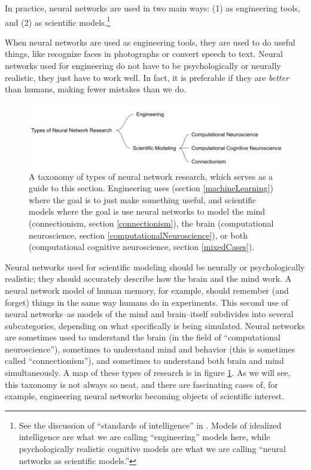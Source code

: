 In practice, neural networks are used in two main ways: (1) as engineering tools, and (2) as scientific models.\footnote{See the discussion of ``standards of intelligence'' in \cite{noelle2022artificial}. Models of idealized intelligence are what we are calling ``engineering'' models here, while psychologically realistic cognitive models are what we are calling ``neural networks as scientific models.''}

When neural networks are used as engineering tools, they are used to do useful things, like recognize faces in photographs or convert speech to text. Neural networks used for engineering do not have to be psychologically or neurally realistic, they just have to work well. In fact, it is preferable if they are \emph{better} than humans, making fewer mistakes than we do.

\begin{figure}[h]
\centering
\includegraphics[scale=0.4]{./images/TypesOfNNResearch.png}
\caption[Jeff Yoshimi.]{A taxonomy of types of neural network research, which serves as a guide to this section. Engineering uses (section \ref{machineLearning}) where the goal is to just make something useful, and scientific models where the goal is use neural networks to model the mind (connectionism, section \ref{connectionism}), the brain (computational neuroscience, section \ref{computationalNeuroscience}), or both (computational cognitive neuroscience, section \ref{mixedCases}).}
\label{typesNN}
\end{figure}

Neural networks used for scientific modeling should be neurally or psychologically realistic; they should accurately describe how the brain and the mind work. A neural network model of human memory, for example, should remember (and forget) things in the same way humans do in experiments. This second use of neural networks--as models of the mind and brain--itself subdivides into several subcategories, depending on what specifically is being simulated. Neural networks are sometimes used to understand the brain (in the field of ``computational neuroscience''), sometimes to understand mind and behavior (this is sometimes called ``connectionism''), and sometimes to understand both brain and mind simultaneously. A map of these types of research is in figure \ref{typesNN}. As we will see, this taxonomy is not always so neat, and there are fascinating cases of, for example, engineering neural networks becoming objects of scientific interest.
 

